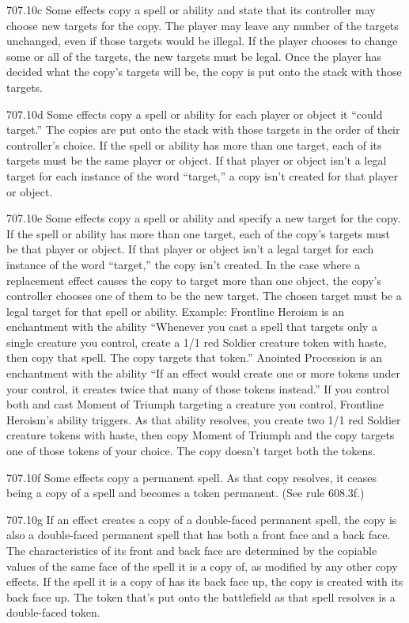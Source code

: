 707.10c Some effects copy a spell or ability and state that its controller may choose new targets for the copy. The player may leave any number of the targets unchanged, even if those targets would be illegal. If the player chooses to change some or all of the targets, the new targets must be legal. Once the player has decided what the copy’s targets will be, the copy is put onto the stack with those targets.

707.10d Some effects copy a spell or ability for each player or object it “could target.” The copies are put onto the stack with those targets in the order of their controller’s choice. If the spell or ability has more than one target, each of its targets must be the same player or object. If that player or object isn’t a legal target for each instance of the word “target,” a copy isn’t created for that player or object.

707.10e Some effects copy a spell or ability and specify a new target for the copy. If the spell or ability has more than one target, each of the copy’s targets must be that player or object. If that player or object isn’t a legal target for each instance of the word “target,” the copy isn’t created. In the case where a replacement effect causes the copy to target more than one object, the copy’s controller chooses one of them to be the new target. The chosen target must be a legal target for that spell or ability.
Example: Frontline Heroism is an enchantment with the ability “Whenever you cast a spell that targets only a single creature you control, create a 1/1 red Soldier creature token with haste, then copy that spell. The copy targets that token.” Anointed Procession is an enchantment with the ability “If an effect would create one or more tokens under your control, it creates twice that many of those tokens instead.” If you control both and cast Moment of Triumph targeting a creature you control, Frontline Heroism’s ability triggers. As that ability resolves, you create two 1/1 red Soldier creature tokens with haste, then copy Moment of Triumph and the copy targets one of those tokens of your choice. The copy doesn’t target both the tokens.

707.10f Some effects copy a permanent spell. As that copy resolves, it ceases being a copy of a spell and becomes a token permanent. (See rule 608.3f.)

707.10g If an effect creates a copy of a double-faced permanent spell, the copy is also a double-faced permanent spell that has both a front face and a back face. The characteristics of its front and back face are determined by the copiable values of the same face of the spell it is a copy of, as modified by any other copy effects. If the spell it is a copy of has its back face up, the copy is created with its back face up. The token that’s put onto the battlefield as that spell resolves is a double-faced token.

